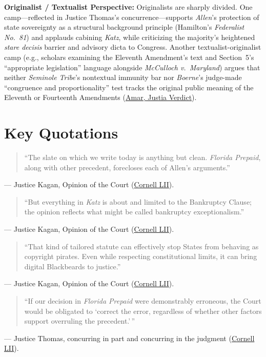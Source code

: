 \documentclass[12pt]{article}
\begin{document}
\textbf{Originalist / Textualist Perspective:} Originalists are sharply divided. One camp---reflected in Justice Thomas's concurrence---supports \textit{Allen}'s protection of state sovereignty as a structural background principle (Hamilton's \textit{Federalist No.\ 81}) and applauds cabining \textit{Katz}, while criticizing the majority's heightened \textit{stare decisis} barrier and advisory dicta to Congress. Another textualist-originalist camp (e.g., scholars examining the Eleventh Amendment's text and Section~5's ``appropriate legislation'' language alongside \textit{McCulloch v.\ Maryland}) argues that neither \textit{Seminole Tribe}'s nontextual immunity bar nor \textit{Boerne}'s judge-made ``congruence and proportionality'' test tracks the original public meaning of the Eleventh or Fourteenth Amendments (\href{https://verdict.justia.com/2020/04/10/how-allen-v-cooper-breaks-important-new-if-dubious-ground-on-stare-decisis}{Amar, Justia Verdict}).

\section{Key Quotations}
\begin{quote}
``The slate on which we write today is anything but clean. \textit{Florida Prepaid}, along with other precedent, forecloses each of Allen's arguments.''
\end{quote}
\noindent --- Justice Kagan, Opinion of the Court (\href{https://www.law.cornell.edu/supremecourt/text/18-877}{Cornell LII}).

\begin{quote}
``But everything in \textit{Katz} is about and limited to the Bankruptcy Clause; the opinion reflects what might be called bankruptcy exceptionalism.''
\end{quote}
\noindent --- Justice Kagan, Opinion of the Court (\href{https://www.law.cornell.edu/supremecourt/text/18-877}{Cornell LII}).

\begin{quote}
``That kind of tailored statute can effectively stop States from behaving as copyright pirates. Even while respecting constitutional limits, it can bring digital Blackbeards to justice.''
\end{quote}
\noindent --- Justice Kagan, Opinion of the Court (\href{https://www.law.cornell.edu/supremecourt/text/18-877}{Cornell LII}).

\begin{quote}
``If our decision in \textit{Florida Prepaid} were demonstrably erroneous, the Court would be obligated to `correct the error, regardless of whether other factors support overruling the precedent.'\,''
\end{quote}
\noindent --- Justice Thomas, concurring in part and concurring in the judgment (\href{https://www.law.cornell.edu/supremecourt/text/18-877}{Cornell LII}).
\end{document}
